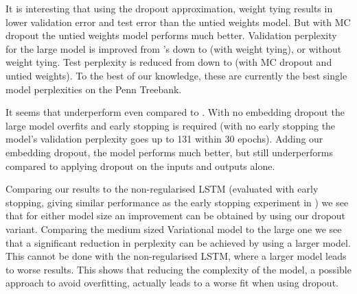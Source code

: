 \documentclass{article}
\theoremstyle{definition}
\begin{document}
It is interesting that using the dropout approximation, weight tying results in lower validation error and test error than the untied weights model. But with MC dropout the untied weights model performs much better.
Validation perplexity for the large model is improved from \citep{zaremba2014recurrent}'s  down to  (with weight tying), or  without weight tying. Test perplexity is reduced from  down to  (with MC dropout and untied weights). To the best of our knowledge, these are currently the best single model perplexities on the Penn Treebank.

It seems that \citet{moon2015rnndrop} underperform even compared to \citep{zaremba2014recurrent}. With no embedding dropout the large model overfits and early stopping is required (with no early stopping the model's validation perplexity goes up to 131 within 30 epochs). Adding our embedding dropout, the model performs much better, but still underperforms compared to applying dropout on the inputs and outputs alone.

Comparing our results to the non-regularised LSTM (evaluated with early stopping, giving similar performance as the early stopping experiment in \citep{zaremba2014recurrent}) we see that for either model size an improvement can be obtained by using our dropout variant. Comparing the medium sized Variational model to the large one we see that a significant reduction in perplexity can be achieved by using a larger model. This cannot be done with the non-regularised LSTM, where a larger model leads to worse results. This shows that reducing the complexity of the model, a possible approach to avoid overfitting, actually leads to a worse fit when using dropout. 
\end{document}
